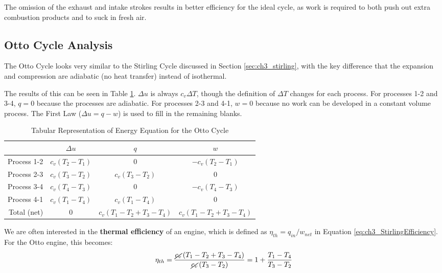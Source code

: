 The omission of the exhaust and intake strokes results in better efficiency for the ideal cycle, as work is required to both push out extra combustion products and to suck in fresh air. 
\subsection{Otto Cycle Analysis}

The Otto Cycle looks very similar to the Stirling Cycle discussed in Section \ref{sec:ch3_stirling}, with the key difference that the expansion and compression are adiabatic (no heat transfer) instead of isothermal.

The results of this can be seen in Table \ref{tab:ch3_otto}.  $\Delta u$ is always $c_v \Delta T$, though the definition of $\Delta T$ changes for each process.  For processes 1-2 and 3-4, $q=0$ because the processes are adiabatic.  For processes 2-3 and 4-1, $w=0$ because no work can be developed in a constant volume process.  The First Law ($\Delta u = q - w$) is used to fill in the remaining blanks.

\begin{table}[H]
  \centering
\def\arraystretch{1.5}
\caption{Tabular Representation of Energy Equation for the Otto Cycle}
\label{tab:ch3_otto}
\begin{tabular}{r|ccc}
            & $\Delta u$        & $q$             & $w$           \\ \hline
Process 1-2 & $ c_v (T_2-T_1)$ & 0                 &  $ -c_v (T_2-T_1)$ \\
Process 2-3 & $ c_v (T_3-T_2)$ & $ c_v (T_3-T_2)$   & 0       \\
Process 3-4 & $ c_v (T_4-T_3)$ & 0                 &  $ -c_v (T_4-T_3)$ \\ 
Process 4-1 & $ c_v (T_1-T_4)$ & $ c_v (T_1-T_4)$  &  0          \\ \hhline{=|===}
Total (net) & 0                 & $c_v (T_1-T_2+T_3-T_4)$ & $c_v (T_1-T_2+T_3-T_4)$
\end{tabular}
\def\arraystretch{1.0}
\end{table}

We are often interested in the {\bf thermal efficiency} of an engine, which is defined as $\eta_{th} = q_{in}/w_{net}$ in Equation \ref{eq:ch3_StirlingEfficiency}.  For the Otto engine, this becomes:
\begin{equation*}
  \eta_{th} = \frac{\cancel{c_v} \left(T_1-T_2+T_3-T_4\right)}{ \cancel{c_v} \left(T_3-T_2\right)} = 1 + \frac{T_1 - T_4}{T_3 - T_2}
\end{equation*}

